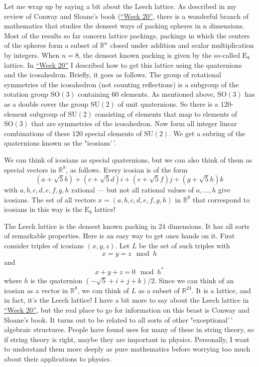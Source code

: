 \documentclass{article}
\begin{document}
Let me wrap up by saying a bit about the Leech lattice. As described in
my review of Conway and Sloane's book (\protect\hyperlink{week20}{``Week
20''}, there is a wonderful branch of mathematics that studies the
densest ways of packing spheres in n dimensions. Most of the results so
far concern lattice packings, packings in which the centers of the
spheres form a subset of \(\mathbb{R}^n\) closed under addition and
scalar multiplication by integers. When \(n = 8\), the densest known
packing is given by the so-called \(\mathrm{E}_8\) lattice. In
\protect\hyperlink{week20}{``Week 20''} I described how to get this
lattice using the quaternions and the icosahedron. Briefly, it goes as
follows. The group of rotational symmetries of the icosahedron (not
counting reflections) is a subgroup of the rotation group
\(\mathrm{SO}(3)\) containing 60 elements. As mentioned above,
\(\mathrm{SO}(3)\) has as a double cover the group \(\mathrm{SU}(2)\) of
unit quaternions. So there is a 120-element subgroup of
\(\mathrm{SU}(2)\) consisting of elements that map to elements of
\(\mathrm{SO}(3)\) that are symmetries of the icosahedron. Now form all
integer linear combinations of these 120 special elements of
\(\mathrm{SU}(2)\). We get a subring of the quaternions known as the
"icosians'\,'.

We can think of icosians as special quaternions, but we can also think
of them as special vectors in \(\mathbb{R}^8\), as follows. Every
icosian is of the form
\[(a + \sqrt{5} b) + (c + \sqrt{5} d)i + (e + \sqrt{5} f)j + (g + \sqrt{5} h)k\]
with \(a,b,c,d,e,f,g,h\) rational --- but not all rational values of
\(a,\ldots,h\) give icosians. The set of all vectors
\(x = (a,b,c,d,e,f,g,h)\) in \(\mathbb{R}^8\) that correspond to
icosians in this way is the \(\mathrm{E}_8\) lattice!

The Leech lattice is the densest known packing in 24 dimensions. It has
all sorts of remarkable properties. Here is an easy way to get ones
hands on it. First consider triples of icosians \((x,y,z)\). Let \(L\)
be the set of such triples with \[x = y = z \mod h\] and
\[x + y + z = 0 \mod h^*\] where \(h\) is the quaternion
\((-\sqrt{5} + i + j + k)/2\). Since we can think of an icosian as a
vector in \(\mathbb{R}^8\), we can think of \(L\) as a subset of
\(\mathbb{R}^{24}\). It is a lattice, and in fact, it's the Leech
lattice! I have a bit more to say about the Leech lattice in
\protect\hyperlink{week20}{``Week 20''}, but the real place to go for
information on this beast is Conway and Sloane's book. It turns out to
be related to all sorts of other "exceptional'\,' algebraic structures.
People have found uses for many of these in string theory, so if string
theory is right, maybe they are important in physics. Personally, I want
to understand them more deeply as pure mathematics before worrying too
much about their applications to physics.
\end{document}
